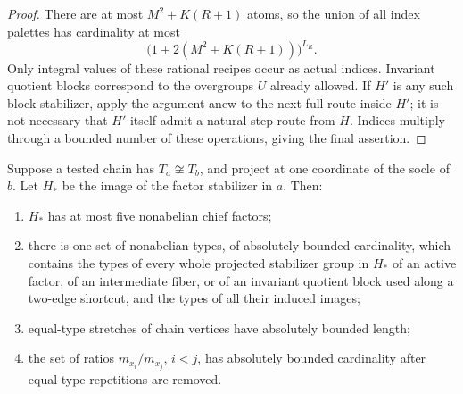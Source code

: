 \begin{proof}
There are at most $M^2+K(R+1)$ atoms, so the union of all index
palettes has cardinality at most
\[
 \bigl(1+2(M^2+K(R+1))\bigr)^{L_R}.
\]
Only integral values of these rational recipes occur as actual
indices.  Invariant quotient blocks correspond to the overgroups
$U$ already allowed.  If $H'$ is any such block stabilizer, apply
the argument anew to the next full route inside $H'$; it is not
necessary that $H'$ itself admit a natural-step route from $H$.
Indices multiply through a bounded number of these operations,
giving the final assertion.
\end{proof}

\begin{lemma}\label{cls:uniform-actions}
Suppose a tested chain has $T_a\not\cong T_b$, and project at one
coordinate of the socle of $b$.  Let $H_*$ be the image of the factor
stabilizer in $a$.  Then:
\begin{enumerate}[label=\textup{(\roman*)}]
\item $H_*$ has at most five nonabelian chief factors;
\item there is one set of nonabelian types, of absolutely bounded
cardinality, which contains the types of every whole projected
stabilizer group in $H_*$ of an active factor, of an intermediate
fiber, or of an invariant quotient block used along a two-edge
shortcut, and the types of all their induced images;
\item equal-type stretches of chain vertices have absolutely
bounded length;
\item the set of ratios $m_{x_i}/m_{x_j}$, $i<j$, has absolutely
bounded cardinality after equal-type repetitions are removed.
\end{enumerate}
\end{lemma}
